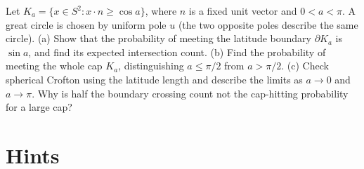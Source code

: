 \begin{exercise}[$\star\star$]\label{ex:v9-ch11-spherical-cap}
Let $K_a=\{x\in S^2:x\cdot n\ge\cos a\}$, where $n$ is a fixed unit vector and $0<a<\pi$. A great circle is chosen by uniform pole $u$ (the two opposite poles describe the same circle).
(a) Show that the probability of meeting the latitude boundary $\partial K_a$ is $\sin a$, and find its expected intersection count.
(b) Find the probability of meeting the whole cap $K_a$, distinguishing $a\le\pi/2$ from $a>\pi/2$.
(c) Check spherical Crofton using the latitude length and describe the limits as $a\to0$ and $a\to\pi$. Why is half the boundary crossing count not the cap-hitting probability for a large cap?
\end{exercise}

\section{Hints}

